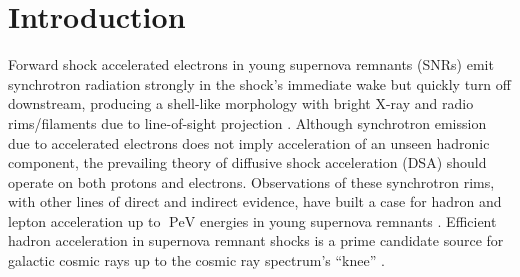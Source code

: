 \documentclass[iop, apj, numberedappendix, twocolappendix]{emulateapj}
\newcommand*{\mt}{\mathrm}
\newcommand*{\unit}[1]{\;\mt{#1}}  %
\begin{document}


\section{Introduction} \label{sec:intro}

Forward shock accelerated electrons in young supernova remnants (SNRs) emit
synchrotron radiation strongly in the shock's immediate wake but quickly turn
off downstream, producing a shell-like morphology with bright X-ray and radio
rims/filaments due to line-of-sight projection \citep{koyama1995}.  Although
synchrotron emission due to accelerated electrons does not imply acceleration
of an unseen hadronic component, the prevailing theory of diffusive shock
acceleration (DSA) should operate on both protons and electrons.  Observations
of these synchrotron rims, with other lines of direct and indirect evidence,
have built a case for hadron and lepton acceleration up to $\unit{PeV}$
energies in young supernova remnants \citep{uchiyama2007, aharonian2004,
acero2010, ackermann2013}.  Efficient hadron acceleration in supernova remnant
shocks is a prime candidate source for galactic cosmic rays up to the
cosmic ray spectrum's ``knee'' \citep{vink2012}.
\end{document}
